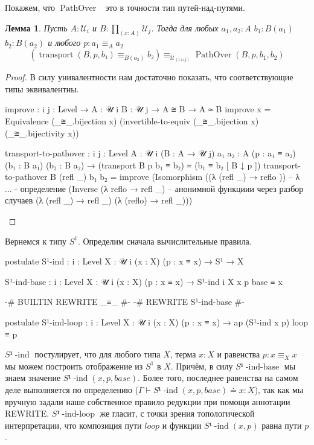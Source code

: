 \documentclass{article}[12pt]
\newtheorem{lemma}{Лемма}
\newcommand{\dash}{\textemdash\ }
\newcommand{\op}{\operatorname}
\begin{document}
Покажем, что $\op{PathOver}$ \dash это в точности тип путей-над-путями.
\begin{lemma}
    Пусть $A : \mathcal U_i$ и $B : \prod_{(x : A)} \mathcal U_j$. Тогда для
    любых $a_1, a_2 : A$ $b_1 : B(a_1)$ $b_2 : B(a_2)$ и любого $p : a_1 \equiv_A a_2$
    $$(\op{transport}(B, p, b₁) ≡_{B(a_2)} b₂) \equiv_{\mathcal{U}_{(i \sqcup j)}} \op{PathOver}(B, p, b_1, b_2)$$
\end{lemma}
\begin{proof}
В силу унивалентности нам достаточно показать, что соответствующие типы эквивалентны.
\begin{code}
improve : {i j : Level} → {A : 𝒰 i} {B : 𝒰 j} 
          → A ≅ B 
          → A ≃ B
improve x = 
    Equivalence (_≅_.bijection x) (invertible-to-equiv (_≅_.bijection x) (_≅_.bijectivity x))

transport-to-pathover : {i j : Level} {A : 𝒰 i} (B : A → 𝒰 j)
                        {a₁ a₂ : A} (p : a₁ ≡ a₂)
                        (b₁ : B a₁) (b₂ : B a₂)
                     → (transport B p b₁ ≡ b₂) ≃ (b₁ ≡ b₂ [ B ↓ p ]) 
transport-to-pathover B (refl _) b₁ b₂ = 
    improve (Isomorphism ((λ { (refl _) → reflo })) -- λ {...} - определение
            (Inverse (λ { reflo → refl _}) -- анонимной функциии через разбор случаев
                     (λ {(refl _) → refl _})
                     (λ {(reflo) → refl _})))
\end{code}
\end{proof}

Вернемся к типу $S^1$. Определим сначала вычислительные правила.
\begin{code}
postulate 
    S¹-ind : {i : Level} {X : 𝒰 i} (x : X) (p : x ≡ x) → S¹ → X
  
    S¹-ind-base : {i : Level} {X : 𝒰 i} (x : X) (p : x ≡ x)
                → S¹-ind {i} {X} x p base ≡ x

{-# BUILTIN REWRITE _≡_ #-}
{-# REWRITE S¹-ind-base #-}

postulate
    S¹-ind-loop : {i : Level} {X : 𝒰 i} (x : X) (p : x ≡ x)
                → ap (S¹-ind x p) loop ≡ p
\end{code}
$S¹\op{-ind}$ постулирует, что для любого типа $X$, терма $x : X$ и равенства $p : x \equiv_{X} x$
мы можем построить отображение из $S^1$ в $X$. Причём, в силу $S¹\op{-ind-base}$ мы знаем
значение $S¹\op{-ind}(x, p, base)$. Более того, последнее равенства
на самом деле выполняется по определению ($\Gamma \vdash S¹\op{-ind}(x, p, base) \doteq x : X$),
так как мы вручную задали наше собственное правило редукции при помощи аннотации REWRITE. 
$S¹\op{-ind-loop}$ же гласит, с точки зрения топологической интерпретации, что 
композиция пути $loop$ и функции $S¹\op{-ind}(x, p)$ равна пути $p$.
\end{document}
